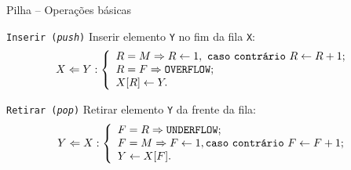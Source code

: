 \begin{frame}[fragile]{Pilha -- Operações básicas}

\begin{block}{{\tt Inserir ({\em push})}}
Inserir elemento {\tt Y} \alert{no fim} da fila {\tt X}:\\

\[
 X \Leftarrow Y :  
\left\{
\begin{array}{l}
 R = M \Rightarrow R \leftarrow 1,\ {\tt caso\ contr\acute{a}rio}\ R
 \leftarrow R + 1;\\
 R = F \Rightarrow {\tt OVERFLOW};\\
 X[R] \leftarrow Y.
\end{array}
 \right.
\]

\end{block}

\begin{block}{{\tt Retirar ({\em pop})}}
Retirar elemento {\tt Y} \alert{da frente} da fila:\\

\[
 Y \Leftarrow X :  
\left\{
\begin{array}{l}
 F = R \Rightarrow {\tt UNDERFLOW};\\ 
 F = M \Rightarrow F \leftarrow 1, {\tt caso\ contr\acute{a}rio}\ F \leftarrow F
 + 1;\\
 Y \leftarrow X[F].
\end{array}
 \right.
\]

\end{block}


\end{frame}


